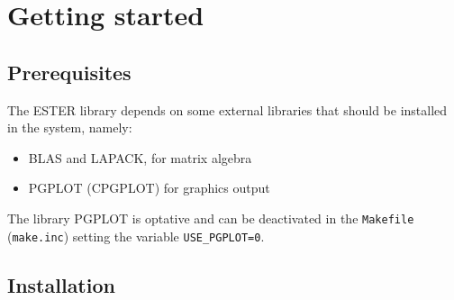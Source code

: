 \chapter{Getting started}
\section{Prerequisites}

The ESTER library depends on some external libraries that should be installed in the system, namely:
\begin{itemize}
\item BLAS and LAPACK, for matrix algebra
\item PGPLOT (CPGPLOT) for graphics output
\end{itemize}
The library PGPLOT is optative and can be deactivated in the {\tt Makefile} ({\tt make.inc}) setting the variable {\tt USE\_PGPLOT=0}.

\section{Installation}

